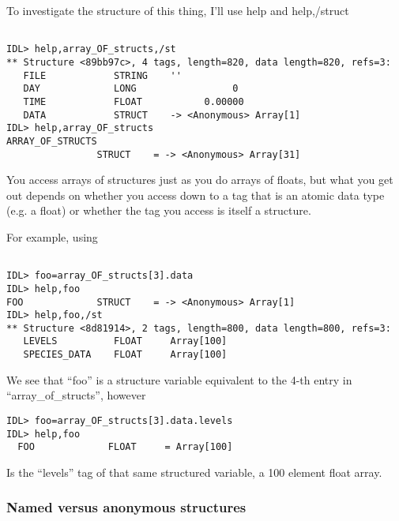 
To investigate the structure of this thing, I'll use help and help,/struct

\begin{IDLExample}
\begin{verbatim}

IDL> help,array_OF_structs,/st
** Structure <89bb97c>, 4 tags, length=820, data length=820, refs=3:
   FILE            STRING    ''
   DAY             LONG                 0
   TIME            FLOAT           0.00000
   DATA            STRUCT    -> <Anonymous> Array[1]
IDL> help,array_OF_structs
ARRAY_OF_STRUCTS
                STRUCT    = -> <Anonymous> Array[31]

\end{verbatim}
\end{IDLExample}
  
You access arrays of structures just as you do arrays of floats, but
what you get out depends on whether you access down to a tag that is
an atomic data type (e.g. a float) or whether the tag you access is
itself a structure.

For example, using

\begin{IDLExample}
\begin{verbatim}

IDL> foo=array_OF_structs[3].data
IDL> help,foo
FOO             STRUCT    = -> <Anonymous> Array[1]
IDL> help,foo,/st
** Structure <8d81914>, 2 tags, length=800, data length=800, refs=3:
   LEVELS          FLOAT     Array[100]
   SPECIES_DATA    FLOAT     Array[100]
\end{verbatim}
\end{IDLExample}

We see that ``foo'' is a structure variable equivalent to the 4-th
entry in ``array\_of\_structs'', however 

\begin{IDLExample}
\begin{verbatim}
IDL> foo=array_OF_structs[3].data.levels
IDL> help,foo
  FOO             FLOAT     = Array[100]
\end{verbatim}
\end{IDLExample}

Is the ``levels'' tag of that same structured variable, a 100 element
float array.


\subsubsection{Named versus anonymous structures}

